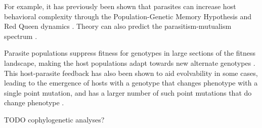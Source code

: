 For example, it has previously been shown that parasites can increase host behavioral complexity through the Population-Genetic Memory Hypothesis and Red Queen dynamics \citep{ladle1992parasites,zaman2014coevolution}.
Theory can also predict the parasitism-mutualism spectrum \citep{vostinar2019spatial,johnson2021coevolutionary}.

Parasite populations suppress fitness for genotypes in large sections of the fitness landscape, making the host populations adapt towards new alternate genotypes \citep{gupta2022hostparasite,zaman2014coevolution,kussell2006polymerpopulation, kumawat2021architecture}.
This host-parasite feedback has also been shown to aid evolvability in some cases, leading to the emergence of hosts with a genotype that changes phenotype with a single point mutation, and has a larger number of such point mutations that do change phenotype \citep{zaman2014coevolution}.

TODO cophylogenetic analyses?
